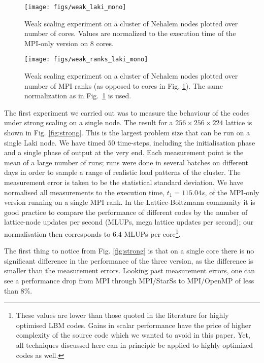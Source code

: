 \documentclass[conference]{IEEEtran}
\newcommand{\starss}{{StarSs}}
\begin{document}
\begin{figure}[!t]\centering
\texttt{[image: figs/weak\_laki\_mono]}
  \caption{Weak scaling experiment on a cluster of Nehalem nodes
    plotted over number of cores. Values are normalized to the
    execution time of the MPI-only version on 8 cores.}
  \label{fig:weak_cores}
\end{figure}

\begin{figure}[!t]\centering
\texttt{[image: figs/weak\_ranks\_laki\_mono]}
  \caption{Weak scaling experiment on a cluster of Nehalem
    nodes plotted over number of MPI ranks (as opposed to cores in
    Fig. \ref{fig:weak_cores}). The same normalization as in Fig.~\ref{fig:weak_cores} is used.}
  \label{fig:weak_ranks}
\end{figure}

The first experiment we carried out was to measure the behaviour of the codes
under strong scaling on a single node.
The result for a \mbox{$256\times256\times224$} lattice is shown in
Fig. \ref{fig:strong}. This is the largest problem size that can be
run on a single Laki node. We have timed $50$ time-steps, including the
initialisation phase and a single phase of output at the very
end. Each measurement point is the mean of a large number of runs;
runs were done in several batches on different days in order to sample
a range of realistic load patterns of the cluster. The measurement
error is taken to be the statistical standard deviation. We have
normalised all measurements to the execution time, $t_1 = 115.04 s$,
of the MPI-only version running on a single MPI rank. In the
Lattice-Boltzmann community it is good practice to compare the performance of
different codes by the number of lattice-node updates per second
(MLUPs, mega lattice updates per second); our normalisation then
corresponds to $6.4$ MLUPs per core\footnote{These values are lower
  than those quoted in the literature for highly optimised LBM
  codes. Gains in scalar performance have the price of higher
  complexity of the source code which we wanted to avoid in this
  paper. Yet, all techniques discussed here can in principle be
  applied to highly optimized codes as well.}.


The first thing to notice from Fig. \ref{fig:strong} is that on a
single core there is no significant difference in the performance of
the three version, as the difference is smaller than the measurement
errors. Looking past measurement errors, one can see a performance
drop from MPI through MPI/\starss{} to MPI/OpenMP of less than $8\%$.
\end{document}
